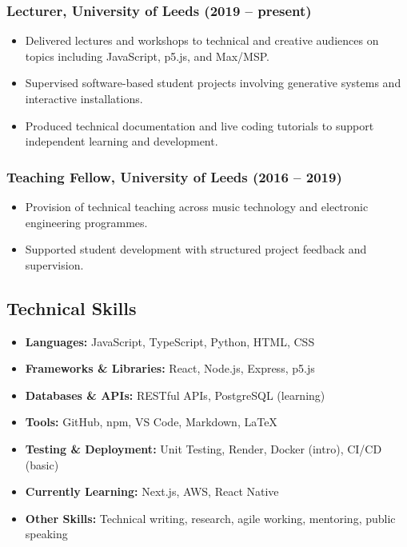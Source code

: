 \documentclass[11pt,a4paper]{article}
\providecommand{\tightlist}{%
  \setlength{\itemsep}{0pt}\setlength{\parskip}{0pt}}
\begin{document}
\subsubsection{Lecturer, University of Leeds (2019 --
present)}\label{lecturer-university-of-leeds-2019-present}

\begin{itemize}
\tightlist
\item
  Delivered lectures and workshops to technical and creative audiences
  on topics including JavaScript, p5.js, and Max/MSP.
\item
  Supervised software-based student projects involving generative
  systems and interactive installations.
\item
  Produced technical documentation and live coding tutorials to support
  independent learning and development.
\end{itemize}

\subsubsection{Teaching Fellow, University of Leeds (2016 --
2019)}\label{teaching-fellow-university-of-leeds-2016-2019}

\begin{itemize}
\tightlist
\item
  Provision of technical teaching across music technology and electronic
  engineering programmes.
\item
  Supported student development with structured project feedback and
  supervision.
\end{itemize}

\subsection{Technical Skills}\label{technical-skills}

\begin{itemize}
\tightlist
\item
  \textbf{Languages:} JavaScript, TypeScript, Python, HTML, CSS
\item
  \textbf{Frameworks \& Libraries:} React, Node.js, Express, p5.js
\item
  \textbf{Databases \& APIs:} RESTful APIs, PostgreSQL (learning)
\item
  \textbf{Tools:} GitHub, npm, VS Code, Markdown, LaTeX
\item
  \textbf{Testing \& Deployment:} Unit Testing, Render, Docker (intro),
  CI/CD (basic)
\item
  \textbf{Currently Learning:} Next.js, AWS, React Native
\item
  \textbf{Other Skills:} Technical writing, research, agile working,
  mentoring, public speaking
\end{itemize}
\end{document}
